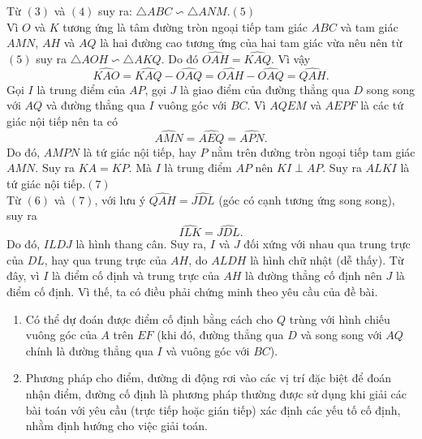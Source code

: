 \begin{bt}
{\begin{center}
\end{center}
 Từ $(3)$ và $(4)$ suy ra: $\triangle ABC\backsim \triangle ANM.$\hfill $(5)$
\\ Vì $O$ và $K$ tương ứng là tâm đường tròn ngoại tiếp tam giác $ABC$ và tam giác $AMN$, $AH$ và $AQ$ là hai đường cao tương ứng của hai tam giác vừa nêu nên từ $(5)$ suy ra $\triangle AOH\backsim \triangle AKQ.$ Do đó $\widehat{OAH}=\widehat{KAQ}$. Vì vậy\[\widehat{KAO}=\widehat{KAQ}-\widehat{OAQ}=\widehat{OAH}-\widehat{OAQ}=\widehat{QAH}.\tag{6}\] 
Gọi $I$ là trung điểm của $AP$, gọi $J$ là giao điểm của đường thẳng qua $D$ song song với $AQ$ và đường thẳng qua $I$ vuông góc với $BC$.
Vì $AQEM$ và $AEPF$ là các tứ giác nội tiếp nên ta có$$\widehat{AMN}=\widehat{AEQ}=\widehat{APN}.$$Do đó, $AMPN$ là tứ giác nội tiếp, hay $P$ nằm trên đường tròn ngoại tiếp tam giác $AMN$. Suy ra $KA=KP$. Mà $I$ là trung điểm $AP$ nên $KI\perp AP$. Suy ra $ALKI$ là tứ giác nội tiếp.\hfill $(7)$\\Từ $(6)$ và $(7)$, với lưu ý $\widehat{QAH}=\widehat{JDL}$ (góc có cạnh tương ứng song song), suy ra $$\widehat{ILK}=\widehat{JDL}.$$ Do đó, $ILDJ$ là hình thang cân. Suy ra, $I$ và $J$ đối xứng với nhau qua trung trực của $DL$, hay qua trung trực của $AH$, do $ALDH$ là hình chữ nhật (dễ thấy). Từ đây, vì $I$ là điểm cố định và trung trực của $AH$ là đường thẳng cố định nên $J$ là điểm cố định. Vì thế, ta có điều phải chứng minh theo yêu cầu của đề bài.
\begin{nx}\hfill
\begin{enumerate}[\bf 1.]
	\item Có thể dự đoán được điểm cố định bằng cách cho $ Q $ trùng với hình chiếu vuông góc của $ A $ trên $ EF $ (khi đó, đường thẳng qua $ D $ và song song với $ AQ $ chính là đường thẳng qua $ I $ và vuông góc với $ BC $).
	\item Phương pháp cho điểm, đường di động rơi vào các vị trí đặc biệt để đoán nhận điểm, đường cố định là phương pháp thường được sử dụng khi giải các bài toán với yêu cầu (trực tiếp hoặc gián tiếp) xác định các yếu tố cố định, nhằm định hướng cho việc giải toán.
\end{enumerate}
\end{nx}
}
\end{bt}

